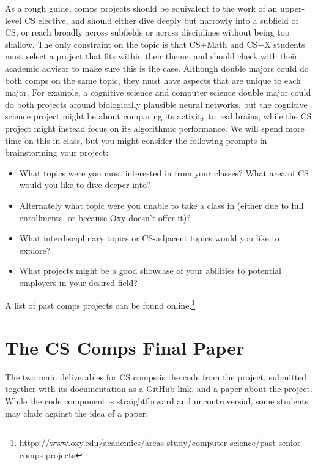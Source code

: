 \documentclass[10pt,twocolumn]{article}
\begin{document}
As a rough guide, comps projects should be equivalent to the work of an upper-level CS elective, and should either dive deeply but narrowly into a subfield of CS, or reach broadly across subfields or across disciplines without being too shallow.
The only constraint on the topic is that CS+Math and CS+X students must select a project that fits within their theme, and should check with their academic advisor to make sure this is the case.
Although double majors could do both comps on the same topic, they must have aspects that are unique to each major.
For example, a cognitive science and computer science double major could do both projects around biologically plausible neural networks, but the cognitive science project might be about comparing its activity to real brains, while the CS project might instead focus on its algorithmic performance.
We will spend more time on this in class, but you might consider the following prompts in brainstorming your project:

\begin{itemize}
    \item What topics were you most interested in from your classes? What area of CS would you like to dive deeper into?
    \item Alternately what topic were you unable to take a class in (either due to full enrollments, or because Oxy doesn't offer it)?
    \item What interdisciplinary topics or CS-adjacent topics would you like to explore?
    \item What projects might be a good showcase of your abilities to potential employers in your desired field?
\end{itemize}

A list of past comps projects can be found online.\footnote{\url{https://www.oxy.edu/academics/areas-study/computer-science/past-senior-comps-projects}}

\section{The CS Comps Final Paper}

The two main deliverables for CS comps is the code from the project, submitted together with its documentation as a GitHub link, and a paper about the project.
While the code component is straightforward and uncontroversial, some students may chafe against the idea of a paper.

\end{document}
